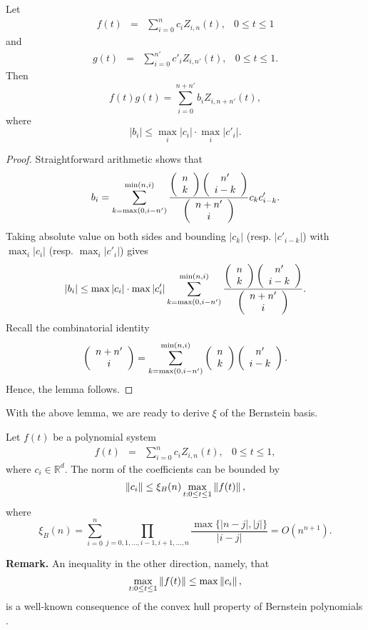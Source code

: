 \documentclass[12pt]{article}
\begin{document}
\begin{lemma}
\label{productbez} Let
\[
\begin{array}{llll}
f(t) &=& \sum_{i=0}^n c_{i} Z_{i,n}(t),
& 0 \leq t \leq 1
\end{array}
\]
and
\[
\begin{array}{llll}
g(t) &=& \sum_{i=0}^{n'} c'_{i}
Z_{i,n'}(t), & 0 \leq t \leq 1.
\end{array}
\]
Then
\[
f(t)g(t) = \sum_{i=0}^{n+n'} b_{i}
Z_{i,n+n'}(t),
\]
where
\[
|b_{i}| \leq \max_{i} |c_{i}| \cdot \max_{i} |c'_{i}|.
\]
\begin{proof}
Straightforward arithmetic shows that
\[
b_{i} = \sum_{k=\max(0,i-n')}^{\min(n,i)}
         \frac{\left(\begin{array}{c} n\\ k \end{array} \right)\left(\begin{array}{c} n'\\ i-k \end{array} \right)}{\left(\begin{array}{c} n+n'\\ i \end{array} \right)}
         c_{k}c'_{i-k}.
\]
Taking absolute value on both sides and bounding $|c_{k}|$ (resp.
$|c'_{i-k}|$) with $\max_{i} |c_{i}|$ (resp. $\max_{i}
|c'_{i}|$) gives
\[
|b_{i}| \leq \max |c_{i}| \cdot \max |c'_{i}|
\sum_{k=\max(0,i-n')}^{\min(n,i)}
         \frac{\left(\begin{array}{c} n\\ k \end{array} \right)\left(\begin{array}{c} n'\\ i-k \end{array} \right)}{\left(\begin{array}{c} n+n'\\ i \end{array} \right)}.
\]
Recall the combinatorial identity
\[
\left(\begin{array}{c} n+n'\\ i \end{array} \right) =
\sum_{k=\max(0,i-n')}^{\min(n,i)}\left(\begin{array}{c} n\\ k \end{array} \right)\left(\begin{array}{c} n'\\ i-k \end{array} \right).
\]
Hence, the lemma follows.
\end{proof}
\end{lemma}

With the above lemma, we are ready to derive $\xi$ of the Bernstein basis.

\begin{thm}
\label{bibound} Let $f(t)$ be a polynomial system
\[
\begin{array}{llll}
f(t) &=& \sum_{i=0}^n c_{i} Z_{i,n}(t), &
0 \leq t \leq 1,
\end{array}
\]
where $c_{i} \in \mathbb{R}^d$. The norm of the coefficients
can be bounded by
\begin{equation}
\label{ceq}  \left\|c_{i}\right\| \leq  \xi_B(n) \max_{t : 0
\leq t \leq 1} \left\|f(t)\right\|,
\end{equation}
where
\[
\xi_B(n) = \sum_{i=0}^n \prod_{j=0,1,\ldots,i-1,i+1,\ldots,n} \frac{\max\{|n-j|,|j|\}}{|i-j|}
= O(n^{n+1}).
\]
\end{thm}

\begin{flushleft}
\textbf{Remark.} An inequality in the other
direction, namely, that
\[
\max_{t : 0 \leq t \leq 1} \left\|f(t)\right\| \leq \max
\left\|c_{i}\right\|,
\]
is a well-known consequence of the convex hull property of
Bernstein polynomials \cite{farin}.
\end{flushleft}
\end{document}
